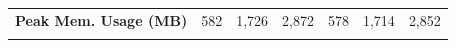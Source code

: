 \documentclass[format=acmsmall, review=false, screen=true]{acmart}
\begin{document}
\begin{table}[hbt]
{\begin{tabular}{lllllll}
    \multicolumn{1}{l|}{\textbf{Peak Mem. Usage (MB)}}                                                     & 582                                                 & 1,726                                              & \multicolumn{1}{l|}{2,872}                                              & 578                                               & 1,714                                                     & 2,852                                                     \\
                                                                                                                 &                                                     &                                                    &                                                                         &                                                   &                                                           &
    \end{tabular}
    }%
    \end{table}

\end{document}
